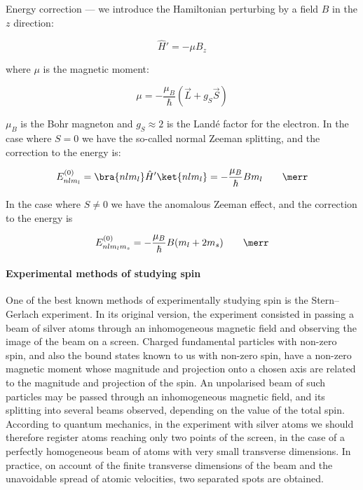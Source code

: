 Energy correction --- we introduce the Hamiltonian perturbing by a field $B$ in the $z$ direction:

\begin{equation}
    \hat{H}' = -\mu B_z
\end{equation}

where $\mu$ is the magnetic moment:

\begin{equation}
    \mu=-\frac{\mu_B}{\hbar}\left(\vec{L} + g_S \vec{S}\right)
\end{equation}

$\mu_B$ is the Bohr magneton and $g_S \approx 2$ is the Landé factor for the electron. In the case where $S = 0$ we have the so-called normal Zeeman splitting, and the correction to the energy is:

\begin{equation}
    E^{(0)}_{nlm_l} = \bra{nlm_l}\hat{H}'\ket{nlm_l} = -\frac{\mu_B}{\hbar}Bm_l \qquad \merr
\end{equation}

In the case where $S\neq 0$ we have the anomalous Zeeman effect, and the correction to the energy is

\begin{equation}
    E^{(0)}_{nlm_lm_s} = -\frac{\mu_B}{\hbar}B(m_l + 2m_s) \qquad \merr
\end{equation}

\paragraph{Experimental methods of studying spin}

One of the best known methods of experimentally studying spin is the Stern--Gerlach experiment. In its original version, the experiment consisted in passing a beam of silver atoms through an inhomogeneous magnetic field and observing the image of the beam on a screen. Charged fundamental particles with non-zero spin, and also the bound states known to us with non-zero spin, have a non-zero magnetic moment whose magnitude and projection onto a chosen axis are related to the magnitude and projection of the spin. An unpolarised beam of such particles may be passed through an inhomogeneous magnetic field, and its splitting into several beams observed, depending on the value of the total spin. According to quantum mechanics, in the experiment with silver atoms we should therefore register atoms reaching only two points of the screen, in the case of a perfectly homogeneous beam of atoms with very small transverse dimensions. In practice, on account of the finite transverse dimensions of the beam and the unavoidable spread of atomic velocities, two separated spots are obtained.

